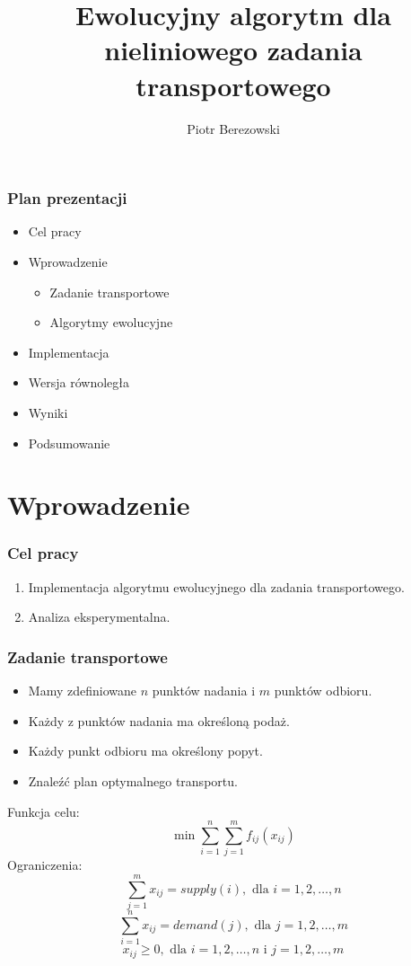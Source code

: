 \documentclass{beamer}
\title{Ewolucyjny algorytm dla nieliniowego zadania transportowego}
\institute{Wydział Podstawowych Problemów Techniki}
\author{Piotr Berezowski}
\begin{document}
\begin{frame}
\frametitle{Plan prezentacji}
\begin{itemize}
\item Cel pracy
\item Wprowadzenie
    \begin{itemize}
    \item Zadanie transportowe
    \item Algorytmy ewolucyjne
    \end{itemize}
\item Implementacja
\item Wersja równoległa    
\item Wyniki
\item Podsumowanie
\end{itemize}
\end{frame}

\section{Wprowadzenie}

\begin{frame}
\frametitle{Cel pracy}
\begin{enumerate}
    \item Implementacja algorytmu ewolucyjnego dla zadania transportowego.
    \item Analiza eksperymentalna.
\end{enumerate}
\end{frame}

\begin{frame}
\frametitle{Zadanie transportowe}
 {
    \begin{itemize}
        \item Mamy zdefiniowane $n$ punktów nadania i $m$ punktów odbioru.
        \item Każdy z punktów nadania ma określoną podaż.
        \item Każdy punkt odbioru ma określony popyt.
        \item Znaleźć plan optymalnego transportu.
    \end{itemize}
}
 {
    Funkcja celu:
    $$\min \sum_{i=1}^{n} \sum_{j=1}^{m} f_{ij}(x_{ij})$$
    Ograniczenia:
    $$\sum_{j=1}^{m} x_{ij} = supply(i), \text{ dla } i = 1, 2, \dots, n$$
    $$\sum_{i=1}^{n} x_{ij} = demand(j), \text{ dla } j = 1, 2, \dots, m$$
    $$x_{ij} \ge 0, \text{ dla } i = 1, 2, \dots, n \text{ i } j = 1, 2, \dots, m$$
}
\end{frame}
\end{document}

